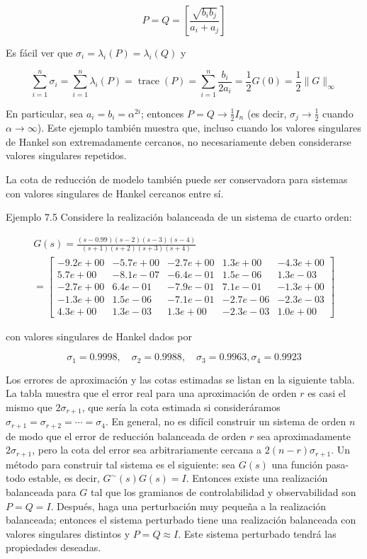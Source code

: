 $$
P=Q=\left[\frac{\sqrt{b_{i} b_{j}}}{a_{i}+a_{j}}\right]
$$

Es fácil ver que $\sigma_{i}=\lambda_{i}(P)=\lambda_{i}(Q)$ y

$$
\sum_{i=1}^{n} \sigma_{i}=\sum_{i=1}^{n} \lambda_{i}(P)=\operatorname{trace}(P)=\sum_{i=1}^{n} \frac{b_{i}}{2 a_{i}}=\frac{1}{2} G(0)=\frac{1}{2}\|G\|_{\infty}
$$

En particular, sea $a_{i}=b_{i}=\alpha^{2 i}$; entonces $P=Q \rightarrow \frac{1}{2} I_{n}$ (es decir, $\sigma_{j} \rightarrow \frac{1}{2}$ cuando $\alpha \rightarrow \infty$). Este ejemplo también muestra que, incluso cuando los valores singulares de Hankel son extremadamente cercanos, no necesariamente deben considerarse valores singulares repetidos.

La cota de reducción de modelo también puede ser conservadora para sistemas con valores singulares de Hankel cercanos entre sí.

Ejemplo 7.5 Considere la realización balanceada de un sistema de cuarto orden:

$$
\begin{gathered}
G(s)=\frac{(s-0.99)(s-2)(s-3)(s-4)}{(s+1)(s+2)(s+3)(s+4)} \\
=\left[\begin{array}{cccc|c}
-9.2 e+00 & -5.7 e+00 & -2.7 e+00 & 1.3 e+00 & -4.3 e+00 \\
5.7 e+00 & -8.1 e-07 & -6.4 e-01 & 1.5 e-06 & 1.3 e-03 \\
-2.7 e+00 & 6.4 e-01 & -7.9 e-01 & 7.1 e-01 & -1.3 e+00 \\
-1.3 e+00 & 1.5 e-06 & -7.1 e-01 & -2.7 e-06 & -2.3 e-03 \\
\hline 4.3 e+00 & 1.3 e-03 & 1.3 e+00 & -2.3 e-03 & 1.0 e+00
\end{array}\right]
\end{gathered}
$$

con valores singulares de Hankel dados por

$$
\sigma_{1}=0.9998, \quad \sigma_{2}=0.9988, \quad \sigma_{3}=0.9963, \sigma_{4}=0.9923
$$

Los errores de aproximación y las cotas estimadas se listan en la siguiente tabla. La tabla muestra que el error real para una aproximación de orden $r$ es casi el mismo que $2 \sigma_{r+1}$, que sería la cota estimada si consideráramos $\sigma_{r+1}=\sigma_{r+2}=\cdots=\sigma_{4}$. En general, no es difícil construir un sistema de orden $n$ de modo que el error de reducción balanceada de orden $r$ sea aproximadamente $2 \sigma_{r+1}$, pero la cota del error sea arbitrariamente cercana a $2(n-r) \sigma_{r+1}$. Un método para construir tal sistema es el siguiente: sea $G(s)$ una función pasa-todo estable, es decir, $G^{\sim}(s) G(s)=I$. Entonces existe una realización balanceada para $G$ tal que los gramianos de controlabilidad y observabilidad son $P=Q=I$. Después, haga una perturbación muy pequeña a la realización balanceada; entonces el sistema perturbado tiene una realización balanceada con valores singulares distintos y $P=Q \approx I$. Este sistema perturbado tendrá las propiedades deseadas.

